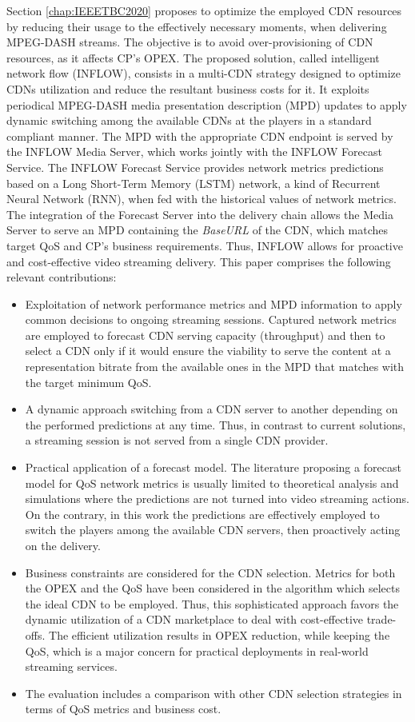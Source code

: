 Section \ref{chap:IEEETBC2020} proposes to optimize the employed CDN resources by reducing their usage to the effectively necessary moments, when delivering MPEG-DASH streams. The objective is to avoid over-provisioning of CDN resources, as it affects CP's OPEX. The proposed solution, called intelligent network flow (INFLOW), consists in a multi-CDN strategy designed to optimize CDNs utilization and reduce the resultant business costs for it. It exploits periodical MPEG-DASH media presentation description (MPD) updates to apply dynamic switching among the available CDNs at the players in a standard compliant manner. The MPD with the appropriate CDN endpoint is served by the INFLOW Media Server, which works jointly with the INFLOW Forecast Service. The INFLOW Forecast Service provides network metrics predictions based on a Long Short-Term Memory (LSTM) network, a kind of Recurrent Neural Network (RNN), when fed with the historical values of network metrics. The integration of the Forecast Server into the delivery chain allows the Media Server to serve an MPD containing the \textit{BaseURL} of the CDN, which matches target QoS and CP's business requirements. Thus, INFLOW allows for proactive and cost-effective video streaming delivery. This paper comprises the following relevant contributions:
\begin{itemize}
	\item Exploitation of network performance metrics and MPD information to apply common decisions to ongoing streaming sessions. Captured network metrics are employed to forecast CDN serving capacity (throughput) and then to select a CDN only if it would ensure the viability to serve the content at a representation bitrate from the available ones in the MPD that matches with the target minimum QoS.
	\item A dynamic approach switching from a CDN server to another depending on the performed predictions at any time. Thus, in contrast to current solutions, a streaming session is not served from a single CDN provider.
	\item Practical application of a forecast model. The literature proposing a forecast model for QoS network metrics is usually limited to theoretical analysis and simulations where the predictions are not turned into video streaming actions. On the contrary, in this work the predictions are effectively employed to switch the players among the available CDN servers, then proactively acting on the delivery.
	\item Business constraints are considered for the CDN selection. Metrics for both the OPEX and the QoS have been considered in the algorithm which selects the ideal CDN to be employed. Thus, this sophisticated approach favors the dynamic utilization of a CDN marketplace to deal with cost-effective trade-offs. The efficient utilization results in OPEX reduction, while keeping the QoS, which is a major concern for practical deployments in real-world streaming services.
	\item The evaluation includes a comparison with other CDN selection strategies in terms of QoS metrics and business cost.
\end{itemize}
